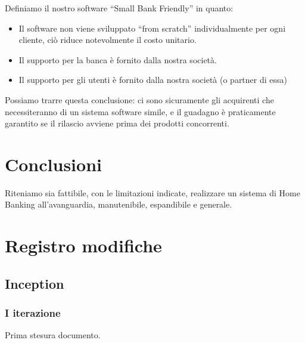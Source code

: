 \documentclass[10pt]{softeng} %
\begin{document}
Definiamo il nostro software ``Small Bank Friendly'' in quanto:
\begin{itemize}
    \item Il software non viene sviluppato ``from scratch'' individualmente per ogni cliente, ci\`o riduce notevolmente il costo unitario.
    \item Il supporto per la banca \`e fornito dalla nostra societ\`a.
    \item Il supporto per gli utenti \`e fornito dalla nostra societ\`a (o partner di essa)
\end {itemize}

Possiamo trarre questa conclusione: ci sono sicuramente gli acquirenti che necessiteranno di un sistema software simile, e il guadagno \`e praticamente garantito se il rilascio avviene prima dei prodotti concorrenti.




\section{Conclusioni}

Riteniamo sia fattibile, con le limitazioni indicate, realizzare un sistema di Home Banking all'avanguardia, manutenibile, espandibile e generale.


\section{Registro modifiche}

\subsection{Inception}

\subsubsection{I iterazione}

Prima stesura documento.


\printcustombibsmall{}
\end{document}
